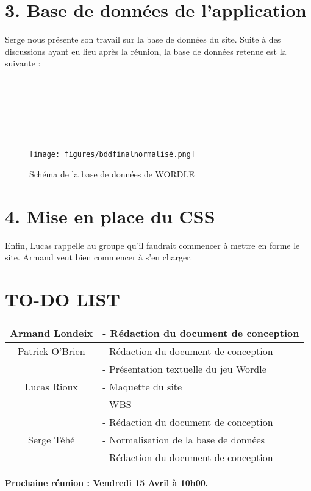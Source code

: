 \section*{3. Base de données de l’application}
\tabto{1cm}Serge nous présente son travail sur la base de données du site. Suite à des discussions ayant eu lieu après la réunion, la base de données retenue est la suivante :\\ \\ \\ \\ \\ \\ \\

\begin{figure}[h!]
\centering
\texttt{[image: figures/bddfinalnormalisé.png]}
\caption{Schéma de la base de données de WORDLE}
\end{figure}

\section*{4. Mise en place du CSS}
\tabto{1cm}Enfin, Lucas rappelle au groupe qu’il faudrait commencer à mettre en forme le site. Armand veut bien commencer à s’en charger.

\section*{TO-DO LIST}

\begin{center}
\begin{tabular}{|c|l|}
    \hline
    Armand Londeix & - Rédaction du document de conception \\
    \hline
    Patrick O'Brien & - Rédaction du document de conception \\
    & - Présentation textuelle du jeu Wordle \\
    \hline
    Lucas Rioux & - Maquette du site \\
    & - WBS \\
    & - Rédaction du document de conception \\
    \hline
    Serge Téhé & - Normalisation de la base de données \\
    & - Rédaction du document de conception \\
    \hline
\end{tabular}
\end{center}

\tabto{0cm}\textbf{Prochaine réunion : Vendredi 15 Avril à 10h00.}